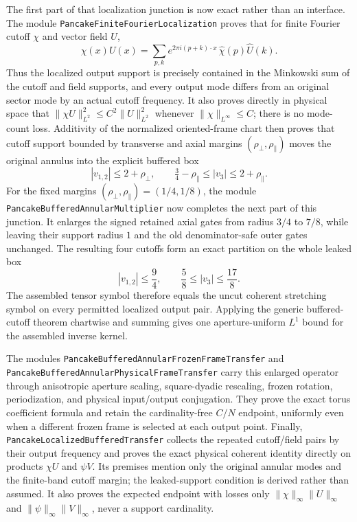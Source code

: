 \documentclass[11pt]{article}
\theoremstyle{definition}
\begin{document}
The first part of that localization junction is now exact rather than an
interface.  The module \texttt{PancakeFiniteFourierLocalization} proves that
for finite Fourier cutoff $\chi$ and vector field $U$,
\[
 \chi(x)U(x)=\sum_{p,k}e^{2\pi i(p+k)\cdot x}\,\widehat\chi(p)\widehat U(k).
\]
Thus the localized output support is precisely contained in the Minkowski
sum of the cutoff and field supports, and every output mode differs from an
original sector mode by an actual cutoff frequency.  It also proves directly
in physical space that $\|\chi U\|_{L^2}^2\leq C^2\|U\|_{L^2}^2$ whenever
$\|\chi\|_{L^\infty}\leq C$; there is no mode-count loss.  Additivity of the
normalized oriented-frame chart then proves that cutoff support bounded by
transverse and axial margins $(\rho_\perp,\rho_\parallel)$ moves the original
annulus into the explicit buffered box
\[
 |v_{1,2}|\leq2+\rho_\perp,
 \qquad \tfrac34-\rho_\parallel\leq|v_3|
       \leq2+\rho_\parallel.
\]
For the fixed margins
$(\rho_\perp,\rho_\parallel)=(1/4,1/8)$, the module
\texttt{PancakeBufferedAnnularMultiplier} now completes the next part of this
junction.  It enlarges the signed retained axial gates from radius $3/4$ to
$7/8$, while leaving their support radius $1$ and the old denominator-safe
outer gates unchanged.  The resulting four cutoffs form an exact partition on
the whole leaked box
\[
 |v_{1,2}|\leq\frac94,
 \qquad \frac58\leq|v_3|\leq\frac{17}{8}.
\]
The assembled tensor symbol therefore equals the uncut coherent stretching
symbol on every permitted localized output pair.  Applying the generic
buffered-cutoff theorem chartwise and summing gives one aperture-uniform
$L^1$ bound for the assembled inverse kernel.

The modules \texttt{PancakeBufferedAnnularFrozenFrameTransfer} and
\texttt{PancakeBufferedAnnularPhysicalFrameTransfer} carry this enlarged
operator through anisotropic aperture scaling, square-dyadic rescaling,
frozen rotation, periodization, and physical input/output conjugation.  They
prove the exact torus coefficient formula and retain the cardinality-free
$C/N$ endpoint, uniformly even when a different frozen frame is selected at
each output point.  Finally, \texttt{PancakeLocalizedBufferedTransfer}
collects the repeated cutoff/field pairs by their output frequency and proves
the exact physical coherent identity directly on products $\chi U$ and
$\psi V$.  Its premises mention only the original annular modes and the
finite-band cutoff margin; the leaked-support condition is derived rather
than assumed.  It also proves the expected endpoint with losses only
$\|\chi\|_\infty\|U\|_\infty$ and
$\|\psi\|_\infty\|V\|_\infty$, never a support cardinality.
\end{document}
